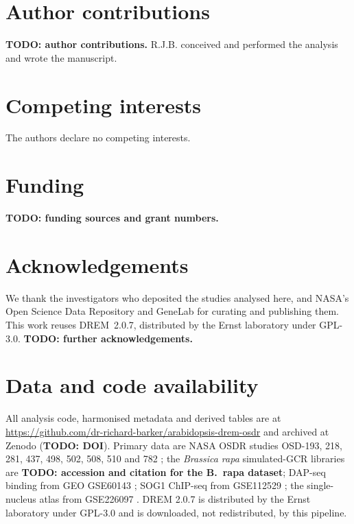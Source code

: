 \documentclass[11pt,a4paper]{article}
\begin{document}
\section*{Author contributions}

\textbf{TODO: author contributions.} R.J.B. conceived and performed the analysis and wrote
the manuscript.

\section*{Competing interests}

The authors declare no competing interests.

\section*{Funding}

\textbf{TODO: funding sources and grant numbers.}

\section*{Acknowledgements}

We thank the investigators who deposited the studies analysed here, and NASA's Open
Science Data Repository and GeneLab for curating and publishing them. This work reuses
DREM~2.0.7, distributed by the Ernst laboratory under GPL-3.0.
\textbf{TODO: further acknowledgements.}

\section*{Data and code availability}
All analysis code, harmonised metadata and derived tables are at
\url{https://github.com/dr-richard-barker/arabidopsis-drem-osdr} and archived at Zenodo
(\textbf{TODO: DOI}). Primary data are NASA OSDR studies OSD-193, 218, 281, 437, 498,
502, 508, 510 and 782 \citep{osdr}; the \textit{Brassica rapa} simulated-GCR libraries
are \textbf{TODO: accession and citation for the B.~rapa dataset}; DAP-seq binding from GEO GSE60143
\citep{geo_gse60143,omalley2016cistrome}; SOG1 ChIP-seq from GSE112529
\citep{geo_gse112529,bourbousse2018sog1}; the single-nucleus atlas from GSE226097
\citep{geo_gse226097,lee2025atlas}. DREM 2.0.7 is distributed by the Ernst laboratory
under GPL-3.0 \citep{dremsoftware} and is downloaded, not redistributed, by this
pipeline.



\end{document}
